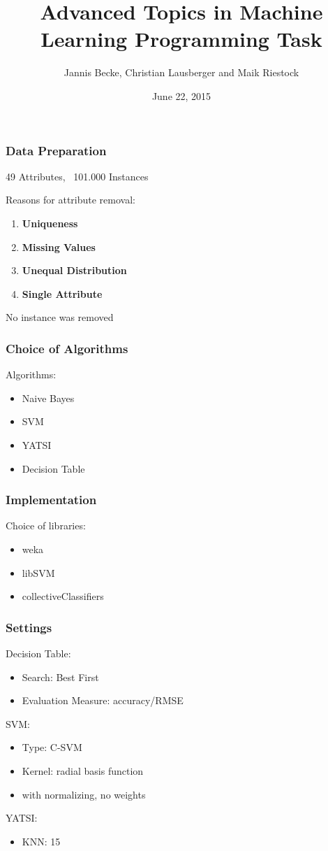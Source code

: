 \documentclass{beamer}
\title{Advanced Topics in Machine Learning Programming Task}
\author{Jannis Becke, Christian Lausberger and Maik Riestock}
\date{June 22, 2015}
\institute{Advanced Topics in Machine Learning}
\begin{document}
\begin{frame}[plain]
 \titlepage
\end{frame}

\begin{frame}
\frametitle{Data Preparation}

49 Attributes, ~101.000 Instances

Reasons for attribute removal:
\begin{enumerate}
\item \textbf{Uniqueness}

\item \textbf{Missing Values}

\item \textbf{Unequal Distribution}

\item \textbf{Single Attribute}
\end{enumerate}
No instance was removed
\end{frame}


\begin{frame}
\frametitle{Choice of Algorithms}
Algorithms:
\begin{itemize}
 \item Naive Bayes
 \item SVM
 \item YATSI
 \item Decision Table
\end{itemize}
\end{frame}

\begin{frame}
\frametitle{Implementation}
Choice of libraries:
\begin{itemize}
 \item weka
 \item libSVM
 \item collectiveClassifiers
\end{itemize}
\end{frame}

\begin{frame}
\frametitle{Settings}
Decision Table:
\begin{itemize}
 \item Search: Best First 
 \item Evaluation Measure: accuracy/RMSE
\end{itemize}

SVM:
\begin{itemize}
 \item Type: C-SVM
 \item Kernel: radial basis function
 \item with normalizing, no weights
\end{itemize}

YATSI:
\begin{itemize}
 \item KNN: 15
\end{itemize}
\end{frame}
\end{document}

